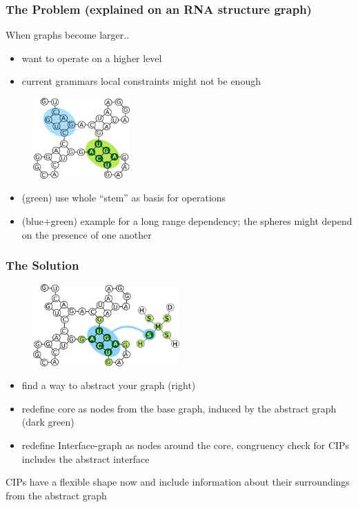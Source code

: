 \documentclass{beamer}
\begin{document}
\begin{frame}
    \frametitle{The Problem (explained on an RNA structure graph)}
    When graphs become larger..
    \begin{itemize}
        \item want to operate on a higher level 
        \item current grammars local constraints might not be enough
    \end{itemize}
   \begin{figure}[h!]
        \centering
        \includegraphics[width=0.33\textwidth]{images/longrangedep.png}
    \end{figure}
    
    \begin{itemize}
        \item (green) use whole ``stem'' as basis for operations
        \item (blue+green) example for a long range dependency; the spheres
            might depend on the presence of one another
    \end{itemize}
\end{frame}



\begin{frame}
    \frametitle{The Solution}
   \begin{figure}[ht]
        \centering
        \includegraphics[width=0.50\textwidth]{images/nucip.png}
    \end{figure}
    \begin{itemize}
        \item find a way to abstract your graph (right)
        \item redefine core as nodes from the base graph, induced by the 
            abstract graph (dark green)
        \item redefine Interface-graph as nodes around the core,
            congruency check for CIPs includes the abstract interface
   \end{itemize}
   CIPs have a flexible shape now and include information about their surroundings
   from the abstract graph
\end{frame}
\end{document}
